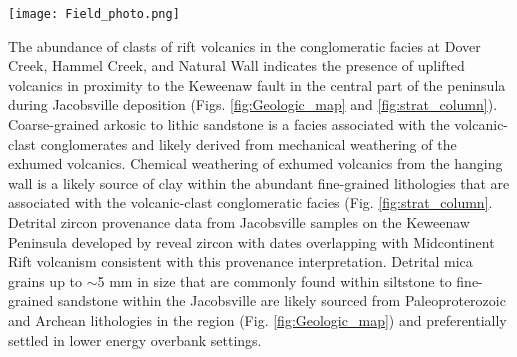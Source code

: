 \begin{figure*}[h!]
\centering
\texttt{[image: Field\_photo.png]}
\caption{\scriptsize Field photos of the Jacobsville Formation. (A) The red/white medium-grained sandstone with decimeter-scale trough cross-stratification in this image (taken at the shore near the unincorporated community of Jacobsville 46.9819\textdegree N, 88.4068\textdegree W) is a wide-spread lithofacies in the formation, but was not targeted for paleomagnetic sampling in this study. (B, C, D) At the Snake Creek tributary and the Natural Wall ravine in the northeastern Keweenaw Peninsula, intervals of red fine-grained sandstone to siltstone beds can be found through the steeply dipping to overturned basal strata near the Keweenaw fault and also the nearly horizontal upper strata. At the Dover Creek section (E), thick red siltstone horizons interbedded or interfingering with sandstones and conglomerates are found along a Dover Creek tributary waterfall (47.1708\textdegree N, 88.4466\textdegree W; this waterfall is distinct, but close to Hungarian Falls). Abundant reoriented siltstone intraclasts can be present within the conglomeratic layers above siltstone beds (Fig. \ref{fig:intraclast_pmag}). (F) At Agate Falls, nearly flat-lying red fissile siltstone beds are exposed. Detrital mica grains deposited parallel to the bedding plane are often present within the siltstone facies. Another set of siltstone intraclasts were sampled from a conglomeratic layer at Agate Falls for a paleomagnetic conglomerate test (Fig. \ref{fig:intraclast_pmag}).}
\label{fig:Field_photo}
\end{figure*}

The abundance of clasts of rift volcanics in the conglomeratic facies at Dover Creek, Hammel Creek, and Natural Wall indicates the presence of uplifted volcanics in proximity to the Keweenaw fault in the central part of the peninsula during Jacobsville deposition (Figs. \ref{fig:Geologic_map} and \ref{fig:strat_column}). Coarse-grained arkosic to lithic sandstone is a facies associated with the volcanic-clast conglomerates and likely derived from mechanical weathering of the exhumed volcanics. Chemical weathering of exhumed volcanics from the hanging wall is a likely source of clay within the abundant fine-grained lithologies that are associated with the volcanic-clast conglomeratic facies (Fig. \ref{fig:strat_column}. Detrital zircon provenance data from Jacobsville samples on the Keweenaw Peninsula developed by  reveal zircon with dates overlapping with Midcontinent Rift volcanism consistent with this provenance interpretation.  Detrital mica grains up to $\sim$5 mm in size that are commonly found within siltstone to fine-grained sandstone within the Jacobsville are likely sourced from Paleoproterozoic and Archean lithologies in the region (Fig. \ref{fig:Geologic_map}) and preferentially settled in lower energy overbank settings.

